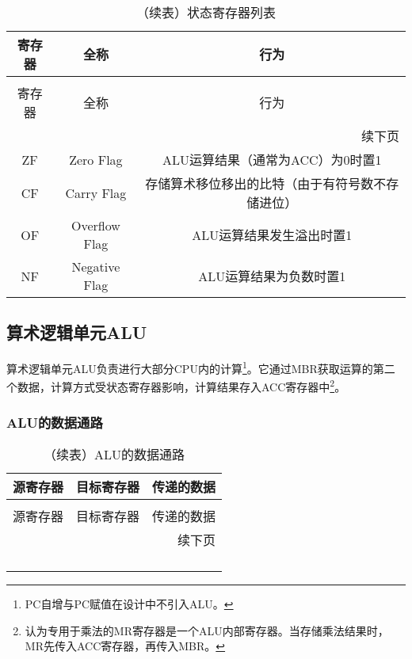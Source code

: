 \documentclass[lang=cn,a4paper,newtx]{elegantpaper}
\begin{document}
\begin{longtable}{c c c}
  \caption{状态寄存器列表} \label{tab:CPU:status} \\
  \toprule
  寄存器 & 全称 & 行为 \\ 
  \midrule
  \endfirsthead

  \caption[]{（续表）状态寄存器列表} \\
  \toprule
  寄存器 & 全称 & 行为\\
  \midrule
  \endhead

  \midrule
  \multicolumn{3}{r}{续下页} \\
  \midrule
  \endfoot

  \bottomrule
  \endlastfoot

  ZF   & Zero Flag             & ALU运算结果（通常为ACC）为0时置1\\
  CF  & Carry Flag     & 存储算术移位移出的比特（由于有符号数不存储进位）\\
  OF  & Overflow Flag &  ALU运算结果发生溢出时置1\\
  NF  & Negative Flag &  ALU运算结果为负数时置1\\
\end{longtable}
\subsection{算术逻辑单元ALU}
算术逻辑单元ALU负责进行大部分CPU内的计算\footnote{PC自增与PC赋值在设计中不引入ALU。}。它通过MBR获取运算的第二个数据，计算方式受状态寄存器影响，计算结果存入ACC寄存器中\footnote{认为专用于乘法的MR寄存器是一个ALU内部寄存器。当存储乘法结果时，MR先传入ACC寄存器，再传入MBR。}。


\subsubsection{ALU的数据通路}
\begin{longtable}{c c c}
  \caption{ALU的数据通路} \label{tab:ALU:DataPath} \\
  \toprule
  源寄存器 & 目标寄存器 & 传递的数据 \\ 
  \midrule
  \endfirsthead

  \caption[]{（续表）ALU的数据通路} \\
  \toprule
  源寄存器 & 目标寄存器 & 传递的数据\\
  \midrule
  \endhead

  \midrule
  \multicolumn{3}{r}{续下页} \\
  \midrule
  \endfoot

  \bottomrule
  \endlastfoot

     &              & \\
    &      & \\
    & &  \\
    &  & \\
\end{longtable}
\end{document}
